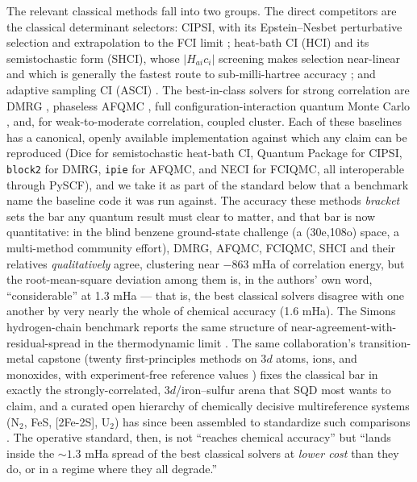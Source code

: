 \documentclass[onecolumn,a4paper]{quantumarticle}
\begin{document}
The relevant classical methods fall into two groups. The direct competitors are the classical determinant selectors: CIPSI, with its Epstein--Nesbet perturbative selection and extrapolation to the FCI limit \cite{huron1973,garniron2019,loos2024}; heat-bath CI (HCI) and its semistochastic form (SHCI), whose $|H_{ai}c_i|$ screening makes selection near-linear and which is generally the fastest route to sub-milli-hartree accuracy \cite{holmes2016,sharma2017}; and adaptive sampling CI (ASCI) \cite{tubman2016}. The best-in-class solvers for strong correlation are DMRG \cite{white1992,chan2002}, phaseless AFQMC \cite{zhangs2003}, full configuration-interaction quantum Monte Carlo \cite{booth2009}, and, for weak-to-moderate correlation, coupled cluster. Each of these baselines has a canonical, openly available implementation against which any claim can be reproduced (Dice for semistochastic heat-bath CI, Quantum Package for CIPSI, \texttt{block2} for DMRG, \texttt{ipie} for AFQMC, and NECI for FCIQMC, all interoperable through PySCF), and we take it as part of the standard below that a benchmark name the baseline code it was run against. The accuracy these methods \emph{bracket} sets the bar any quantum result must clear to matter, and that bar is now quantitative: in the blind benzene ground-state challenge (a (30e,108o) space, a multi-method community effort), DMRG, AFQMC, FCIQMC, SHCI and their relatives \emph{qualitatively} agree, clustering near $-863$ mHa of correlation energy, but the root-mean-square deviation among them is, in the authors' own word, ``considerable'' at 1.3 mHa \cite{eriksen2020} --- that is, the best classical solvers disagree with one another by very nearly the whole of chemical accuracy (1.6 mHa). The Simons hydrogen-chain benchmark reports the same structure of near-agreement-with-residual-spread in the thermodynamic limit \cite{motta2017}. The same collaboration's transition-metal capstone (twenty first-principles methods on 3$d$ atoms, ions, and monoxides, with experiment-free reference values \cite{williams2020}) fixes the classical bar in exactly the strongly-correlated, 3$d$/iron--sulfur arena that SQD most wants to claim, and a curated open hierarchy of chemically decisive multireference systems (N$_2$, FeS, [2Fe-2S], U$_2$) has since been assembled to standardize such comparisons \cite{sundar2026}. The operative standard, then, is not ``reaches chemical accuracy'' but ``lands inside the ${\sim}1.3$ mHa spread of the best classical solvers at \emph{lower cost} than they do, or in a regime where they all degrade.''
\end{document}
